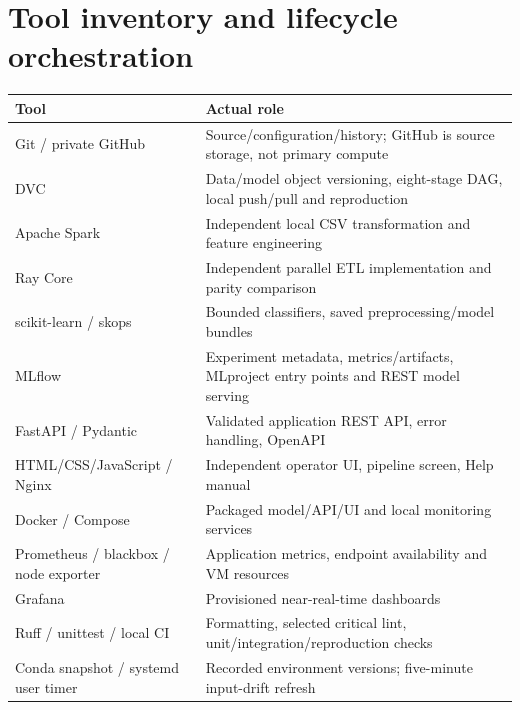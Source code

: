 \documentclass[11pt,a4paper]{article}
\begin{document}
\section{Tool inventory and lifecycle orchestration}
\par
\begin{tabularx}{\linewidth}{@{}lY@{}}\toprule
Tool & Actual role \\\midrule
Git / private GitHub & Source/configuration/history; GitHub is source storage, not primary compute \\
DVC & Data/model object versioning, eight-stage DAG, local push/pull and reproduction \\
Apache Spark & Independent local CSV transformation and feature engineering \\
Ray Core & Independent parallel ETL implementation and parity comparison \\
scikit-learn / skops & Bounded classifiers, saved preprocessing/model bundles \\
MLflow & Experiment metadata, metrics/artifacts, MLproject entry points and REST model serving \\
FastAPI / Pydantic & Validated application REST API, error handling, OpenAPI \\
HTML/CSS/JavaScript / Nginx & Independent operator UI, pipeline screen, Help manual \\
Docker / Compose & Packaged model/API/UI and local monitoring services \\
Prometheus / blackbox / node exporter & Application metrics, endpoint availability and VM resources \\
Grafana & Provisioned near-real-time dashboards \\
Ruff / unittest / local CI & Formatting, selected critical lint, unit/integration/reproduction checks \\
Conda snapshot / systemd user timer & Recorded environment versions; five-minute input-drift refresh \\\bottomrule
\end{tabularx}
\par
\end{document}
